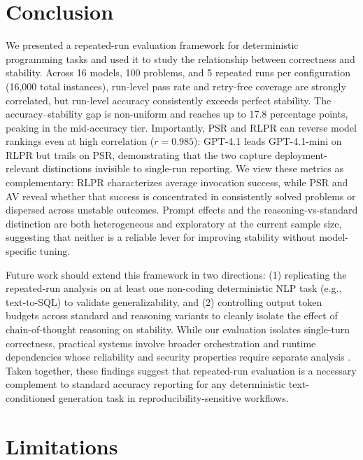 \documentclass[11pt,a4paper]{article}
\begin{document}
\section{Conclusion}

We presented a repeated-run evaluation framework for deterministic programming tasks and used it to study the relationship between correctness and stability. Across 16 models, 100 problems, and 5 repeated runs per configuration (16{,}000 total instances), run-level pass rate and retry-free coverage are strongly correlated, but run-level accuracy consistently exceeds perfect stability. The accuracy--stability gap is non-uniform and reaches up to 17.8 percentage points, peaking in the mid-accuracy tier. Importantly, PSR and RLPR can reverse model rankings even at high correlation ($r=0.985$): GPT-4.1 leads GPT-4.1-mini on RLPR but trails on PSR, demonstrating that the two capture deployment-relevant distinctions invisible to single-run reporting. We view these metrics as complementary: RLPR characterizes average invocation success, while PSR and AV reveal whether that success is concentrated in consistently solved problems or dispersed across unstable outcomes. Prompt effects and the reasoning-vs-standard distinction are both heterogeneous and exploratory at the current sample size, suggesting that neither is a reliable lever for improving stability without model-specific tuning.

Future work should extend this framework in two directions: (1) replicating the repeated-run analysis on at least one non-coding deterministic NLP task (e.g., text-to-SQL) to validate generalizability, and (2) controlling output token budgets across standard and reasoning variants to cleanly isolate the effect of chain-of-thought reasoning on stability. While our evaluation isolates single-turn correctness, practical systems involve broader orchestration and runtime dependencies whose reliability and security properties require separate analysis \cite{jiang2026agenticaicybersecurityattack}. Taken together, these findings suggest that repeated-run evaluation is a necessary complement to standard accuracy reporting for any deterministic text-conditioned generation task in reproducibility-sensitive workflows.

\section*{Limitations}
\end{document}

